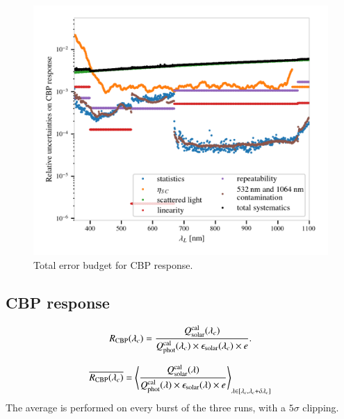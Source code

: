 \begin{figure}[h]
    \centering
    \includegraphics[width=\columnwidth]{fig/cbp_error_budget.png}
    \caption{Total error budget for CBP response.}
    \label{fig:cbp_budget}
\end{figure}

\subsection{CBP response}


\begin{equation}
    R_{\mathrm{CBP}}(\lambda_c) = \frac{Q_{\mathrm{solar}}^{\rm cal}(\lambda_c)}{Q_{\mathrm{phot}}^{\rm cal}(\lambda_c) \times \epsilon_{\mathrm{solar}}(\lambda_c) \times e}.
    \label{eq:rcbp2}
\end{equation} 

\begin{equation}
    \overline{R_{\mathrm{CBP}}(\lambda_c)} = \left\langle\frac{Q_{\mathrm{solar}}^{\rm cal}(\lambda)}{Q_{\mathrm{phot}}^{\rm cal}(\lambda) \times \epsilon_{\mathrm{solar}}(\lambda) \times e}\right\rangle_{\lambda\in [\lambda_c,\lambda_c+\delta \lambda_c]}
    \label{eq:rcbp3}
\end{equation} 
The average is performed on every burst of the three runs, with a $5\sigma$ clipping.


